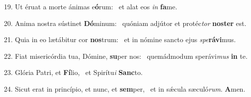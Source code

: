 19. Ut éruat a morte ánimas e\textbf{ó}rum: \ast\  et alat eos \textit{in} \textbf{fa}me.\

20. Anima nostra sústinet \textbf{Dó}minum: \ast\  quóniam adjútor et protéc\textit{tor} \textbf{nos}\textbf{ter} est.\

21. Quia in eo lætábitur cor \textbf{nos}trum: \ast\  et in nómine sancto ejus \textit{spe}\textbf{rá}\textbf{vi}mus.\

22. Fiat misericórdia tua, Dómine, \textbf{su}per nos: \ast\  quemádmodum sperávi\textit{mus} \textbf{in} te.\

23. Glória Patri, et \textbf{Fí}lio, \ast\  et Spirítu\textit{i} \textbf{Sanc}to.\

24. Sicut erat in princípio, et nunc, et \textbf{sem}per, \ast\  et in sǽcula sæculó\textit{rum}. \textbf{A}men.\

